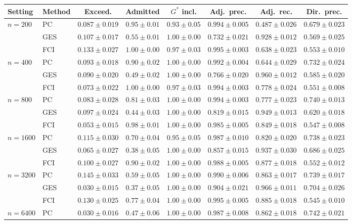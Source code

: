 \begin{tabular}{llcccccc}
\toprule
Setting & Method & Exceed. & Admitted & $G^\ast$ incl. & Adj.\ prec. & Adj.\ rec. & Dir.\ prec. \\
\midrule
$n{=}200$ & PC & $0.087\pm0.019$ & $0.95\pm0.01$ & $0.93\pm0.05$ & $0.994\pm0.005$ & $0.487\pm0.026$ & $0.679\pm0.023$ \\
 & GES & $0.107\pm0.017$ & $0.55\pm0.01$ & $1.00\pm0.00$ & $0.732\pm0.021$ & $0.928\pm0.012$ & $0.569\pm0.025$ \\
 & FCI & $0.133\pm0.027$ & $1.00\pm0.00$ & $0.97\pm0.03$ & $0.995\pm0.003$ & $0.638\pm0.023$ & $0.553\pm0.010$ \\
$n{=}400$ & PC & $0.093\pm0.018$ & $0.90\pm0.02$ & $1.00\pm0.00$ & $0.992\pm0.004$ & $0.644\pm0.029$ & $0.732\pm0.024$ \\
 & GES & $0.090\pm0.020$ & $0.49\pm0.02$ & $1.00\pm0.00$ & $0.766\pm0.020$ & $0.960\pm0.012$ & $0.585\pm0.020$ \\
 & FCI & $0.073\pm0.022$ & $1.00\pm0.00$ & $0.97\pm0.03$ & $0.994\pm0.003$ & $0.778\pm0.024$ & $0.551\pm0.008$ \\
$n{=}800$ & PC & $0.083\pm0.028$ & $0.81\pm0.03$ & $1.00\pm0.00$ & $0.994\pm0.003$ & $0.777\pm0.023$ & $0.740\pm0.013$ \\
 & GES & $0.097\pm0.024$ & $0.44\pm0.03$ & $1.00\pm0.00$ & $0.819\pm0.015$ & $0.949\pm0.013$ & $0.620\pm0.018$ \\
 & FCI & $0.053\pm0.015$ & $0.98\pm0.01$ & $1.00\pm0.00$ & $0.985\pm0.005$ & $0.849\pm0.018$ & $0.547\pm0.008$ \\
$n{=}1600$ & PC & $0.115\pm0.030$ & $0.70\pm0.04$ & $0.95\pm0.05$ & $0.987\pm0.010$ & $0.820\pm0.020$ & $0.738\pm0.023$ \\
 & GES & $0.065\pm0.027$ & $0.38\pm0.05$ & $1.00\pm0.00$ & $0.857\pm0.015$ & $0.937\pm0.030$ & $0.686\pm0.025$ \\
 & FCI & $0.100\pm0.027$ & $0.90\pm0.02$ & $1.00\pm0.00$ & $0.988\pm0.005$ & $0.877\pm0.018$ & $0.552\pm0.012$ \\
$n{=}3200$ & PC & $0.145\pm0.033$ & $0.59\pm0.05$ & $1.00\pm0.00$ & $0.990\pm0.006$ & $0.863\pm0.017$ & $0.739\pm0.017$ \\
 & GES & $0.030\pm0.015$ & $0.37\pm0.05$ & $1.00\pm0.00$ & $0.904\pm0.021$ & $0.966\pm0.011$ & $0.704\pm0.026$ \\
 & FCI & $0.130\pm0.025$ & $0.77\pm0.04$ & $1.00\pm0.00$ & $0.995\pm0.005$ & $0.885\pm0.018$ & $0.545\pm0.010$ \\
$n{=}6400$ & PC & $0.030\pm0.016$ & $0.47\pm0.06$ & $1.00\pm0.00$ & $0.987\pm0.008$ & $0.862\pm0.018$ & $0.742\pm0.021$ \\

\end{tabular}
